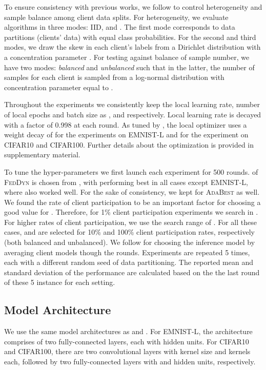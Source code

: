 \documentclass[runningheads]{llncs}
\newcommand{\feddyn}{\textsc{FedDyn}\xspace}
\newcommand{\ours}{\textsc{AdaBest}\xspace}
\def\cifart{{\textsc{CIFAR10}}}
\def\cifarh{{\textsc{CIFAR100}}}
\def\emnist{{\textsc{EMNIST-L}}}
\begin{document}
To ensure consistency with previous works, we follow \cite{acar2021federated} to control heterogeneity and sample balance among client data splits. For  heterogeneity, we evaluate algorithms in three modes: IID,  and . The first mode corresponds to data partitions (clients' data) with equal class probabilities. For the second and third modes, we draw the skew in each client's labels from a Dirichlet distribution with a concentration parameter .
For testing against balance of sample number, we have two modes: \emph{balanced} and \emph{unbalanced} such that in the latter, the number of samples for each client is sampled from a log-normal distribution with concentration parameter equal to . 

Throughout the experiments we consistently keep the local learning rate, number of local epochs and batch size as ,  and  respectively. Local learning rate is decayed with a factor of 0.998 at each round. As tuned by \cite{acar2021federated}, the local optimizer uses a weight decay of  for the experiments on \emnist{} and  for the experiment on \cifart{} and \cifarh{}. Further details about the optimization is provided in supplementary material.

To tune the hyper-parameters we first launch each experiment for 500 rounds.
 of \feddyn is chosen from , with  performing best in all cases except \emnist, where  also worked well. For the sake of consistency, we kept  for \ours as well. We found the rate of client participation to be an important factor for choosing a good value for . Therefore, for 1\% client participation experiments we search  in . For higher rates of client participation, we use the search range of . For all these cases,  and  are selected for 10\% and 100\% client participation rates, respectively (both balanced and unbalanced).  
We follow \cite{acar2021federated} for choosing the inference model by averaging client models though the rounds.
Experiments are repeated 5 times, each with a different random seed of data partitioning. The reported mean and standard deviation of the performance are calculated based on the the last round of these 5 instance for each setting.

\subsection{Model Architecture}
We use the same model architectures as \cite{mcmahan2017communication} and \cite{acar2021federated}. For \emnist, the architecture comprises of two fully-connected layers, each with  hidden units. For \cifart{} and \cifarh{}, there are two convolutional layers with  kernel size and  kernels each, followed by two fully-connected layers with  and  hidden units, respectively. 
\end{document}
